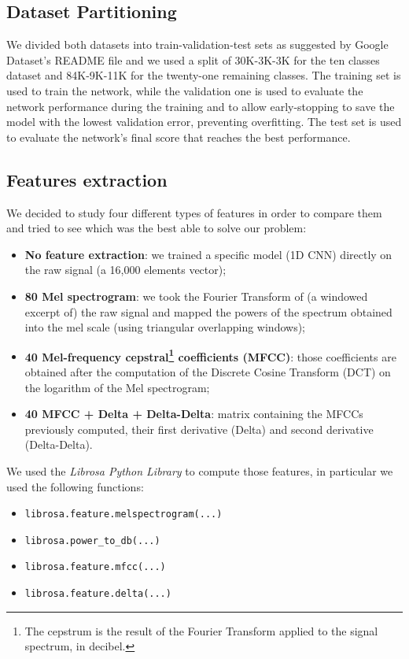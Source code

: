\documentclass[conference]{IEEEtran}
\begin{document}
\subsection{Dataset Partitioning}
We divided both datasets into train-validation-test sets as suggested by Google Dataset’s README file and we used a split of 30K-3K-3K for the ten classes dataset and 84K-9K-11K for the twenty-one remaining classes. The training set is used to train the network, while the validation one is used to evaluate the network performance during the training and to allow early-stopping to save the model with the lowest validation error, preventing overfitting. The test set is used to evaluate the network’s final score that reaches the best performance.

\subsection{Features extraction}

We decided to study four different types of features in order to compare them and tried to see which was the best able to solve our problem:
\begin{itemize}
\item \textbf{No feature extraction}: we trained a specific model (1D CNN) directly on the raw signal (a 16,000 elements vector);
\item \textbf{80 Mel spectrogram}: we took the Fourier Transform of (a windowed excerpt of) the raw signal and mapped the powers of the spectrum obtained into the mel scale (using triangular overlapping windows);
\item \textbf{40 Mel-frequency cepstral\footnote{The cepstrum is the result of the Fourier Transform applied to the signal spectrum, in decibel.} coefficients (MFCC)}: those coefficients are obtained after the computation of the Discrete Cosine Transform (DCT) on the logarithm of the Mel spectrogram;
\item \textbf{40 MFCC + Delta + Delta-Delta}: matrix containing the MFCCs previously computed, their first derivative (Delta) and second derivative (Delta-Delta).
\end{itemize}
We used the \textit{Librosa Python Library} to compute those features, in particular we used the following functions:
\begin{itemize}
\item \texttt{librosa.feature.melspectrogram(...)}
\item \texttt{librosa.power\_to\_db(...)}
\item \texttt{librosa.feature.mfcc(...)}
\item \texttt{librosa.feature.delta(...)}
\end{itemize}
\end{document}
